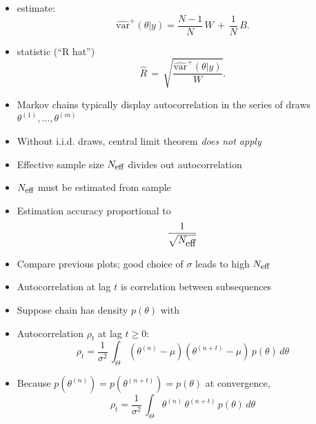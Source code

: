 \documentclass[10pt]{report}
\begin{document}
%
\begin{itemize}
\item {} estimate:
\[\textstyle
\widehat{\mbox{var}}^{+}\!(\theta|y)
= \frac{N-1}{N}\, W \, + \, \frac{1}{N} \, B.
\]
%
\vspace*{6pt}
\item {} statistic (``R hat'')
\[\textstyle
\hat{R}
\, = \,
\sqrt{\frac{\widehat{\mbox{var}}^{+}\!(\theta|y)}{W}}.
\]
\end{itemize}


%
\begin{itemize}
\item Markov chains typically display autocorrelation in the series of
  draws $\theta^{(1)}, \ldots, \theta^{(m)}$
\item Without i.i.d. draws, central limit theorem \emph{does not apply}
\item Effective sample size $N_{\mbox{\footnotesize eff}}$ divides out
  autocorrelation
\item $N_{\mbox{\footnotesize eff}}$ must be estimated from sample
\vspace*{-6pt}
\item Estimation accuracy proportional to
{\Large
\[
\frac{1}{\sqrt{N_{\mbox{\normalsize eff}}}}
\]
}
\item Compare previous plots; good choice of $\sigma$ leads to high
$N_{\mbox{\footnotesize eff}}$
\end{itemize}


%
\begin{itemize}
\item Autocorrelation at lag $t$ is correlation between subsequences
\item  Suppose chain has density $p(\theta)$ with
\item Autocorrelation $\rho_t$ at lag $t \geq 0$:
\[
\rho_t  =  \frac{1}{\sigma^2} \, \int_{\Theta} (\theta^{(n)} - \mu)
       (\theta^{(n+t)} - \mu) \, p(\theta) \, d\theta
\]
\item Because $p(\theta^{(n)}) = p(\theta^{(n+t)}) = p(\theta)$ at convergence,
\[
\rho_t = \frac{1}{\sigma^2} \, \int_{\Theta} \theta^{(n)} \, \theta^{(n+t)} \, p(\theta) \, d\theta
\]
\end{itemize}
\end{document}
